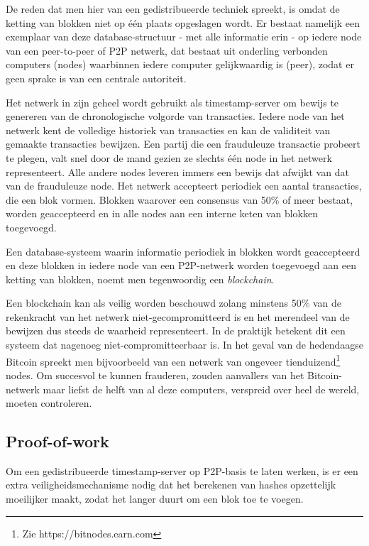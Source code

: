 	De reden dat men hier van een gedistribueerde techniek spreekt, is omdat de ketting van blokken niet op één plaats opgeslagen wordt. Er bestaat namelijk een exemplaar van deze database-structuur - met alle informatie erin - op iedere node van een peer-to-peer of P2P netwerk, dat bestaat uit onderling verbonden computers (nodes) waarbinnen iedere computer gelijkwaardig is (peer), zodat er geen sprake is van een centrale autoriteit.~\autocite{Nakamoto2008} 
	
	Het netwerk in zijn geheel wordt gebruikt als timestamp-server om bewijs te genereren van de chronologische volgorde van transacties. Iedere node van het netwerk kent de volledige historiek van transacties en kan de validiteit van gemaakte transacties bewijzen. Een partij die een frauduleuze transactie probeert te plegen, valt snel door de mand gezien ze slechts één node in het netwerk representeert. Alle andere nodes leveren immers een bewijs dat afwijkt van dat van de frauduleuze node. Het netwerk accepteert periodiek een aantal transacties, die een blok vormen. Blokken waarover een consensus van 50\% of meer bestaat, worden geaccepteerd en in alle nodes aan een interne keten van blokken toegevoegd.~\autocite{Nakamoto2008}
	
	Een database-systeem waarin informatie periodiek in blokken wordt geaccepteerd en deze blokken in iedere node van een P2P-netwerk worden toegevoegd aan een ketting van blokken, noemt men tegenwoordig een \textit{blockchain}.~\autocite{Nakamoto2008}
	
	Een blockchain kan als veilig worden beschouwd zolang minstens 50\% van de rekenkracht van het netwerk niet-gecompromitteerd is en het merendeel van de bewijzen dus steeds de waarheid representeert. In de praktijk betekent dit een systeem dat nagenoeg niet-compromitteerbaar is. In het geval van de hedendaagse Bitcoin spreekt men bijvoorbeeld van een netwerk van ongeveer tienduizend\footnote{Zie https://bitnodes.earn.com} nodes. Om succesvol te kunnen frauderen, zouden aanvallers van het Bitcoin-netwerk maar liefst de helft van al deze computers, verspreid over heel de wereld, moeten controleren.~\autocite{Nakamoto2008} 
			
	\subsection{Proof-of-work}
	\label{subsec:pow}
	Om een gedistribueerde timestamp-server op P2P-basis te laten werken, is er een extra veiligheidsmechanisme nodig dat het berekenen van hashes opzettelijk moeilijker maakt, zodat het langer duurt om een blok toe te voegen.~\autocite{Nakamoto2008} 
	
